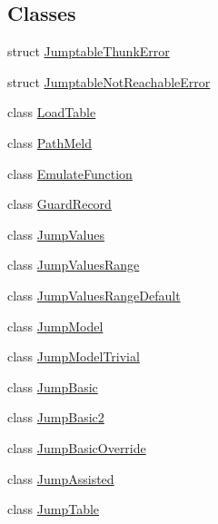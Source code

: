 \subsection*{Classes}
\begin{DoxyCompactItemize}
\item 
struct \mbox{\hyperlink{struct_jumptable_thunk_error}{Jumptable\+Thunk\+Error}}
\item 
struct \mbox{\hyperlink{struct_jumptable_not_reachable_error}{Jumptable\+Not\+Reachable\+Error}}
\item 
class \mbox{\hyperlink{class_load_table}{Load\+Table}}
\item 
class \mbox{\hyperlink{class_path_meld}{Path\+Meld}}
\item 
class \mbox{\hyperlink{class_emulate_function}{Emulate\+Function}}
\item 
class \mbox{\hyperlink{class_guard_record}{Guard\+Record}}
\item 
class \mbox{\hyperlink{class_jump_values}{Jump\+Values}}
\item 
class \mbox{\hyperlink{class_jump_values_range}{Jump\+Values\+Range}}
\item 
class \mbox{\hyperlink{class_jump_values_range_default}{Jump\+Values\+Range\+Default}}
\item 
class \mbox{\hyperlink{class_jump_model}{Jump\+Model}}
\item 
class \mbox{\hyperlink{class_jump_model_trivial}{Jump\+Model\+Trivial}}
\item 
class \mbox{\hyperlink{class_jump_basic}{Jump\+Basic}}
\item 
class \mbox{\hyperlink{class_jump_basic2}{Jump\+Basic2}}
\item 
class \mbox{\hyperlink{class_jump_basic_override}{Jump\+Basic\+Override}}
\item 
class \mbox{\hyperlink{class_jump_assisted}{Jump\+Assisted}}
\item 
class \mbox{\hyperlink{class_jump_table}{Jump\+Table}}
\end{DoxyCompactItemize}
